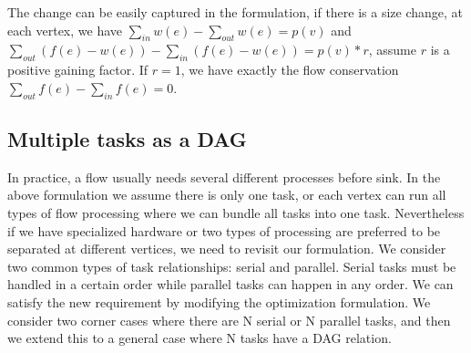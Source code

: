 The change can be easily captured in the formulation, if there is a size change, at each vertex, we have $\sum\limits_{in} w(e) - \sum\limits_{out}  w(e) = p(v)$ and $\sum\limits_{out} (f(e) - w(e))-\sum\limits_{in}  (f(e) - w(e))= p(v)*r$, assume $r$ is a positive gaining factor. If $r=1$, we have exactly the flow conservation $\sum\limits_{out} f(e) -\sum\limits_{in}  f(e)= 0$. 


\subsection{Multiple tasks as a DAG}
In practice, a flow usually needs several different processes before sink. In the above formulation we assume there is only one task, or each vertex can run all types of flow processing where we can bundle all tasks into one task. Nevertheless if we have specialized hardware or two types of processing are preferred to be separated at different vertices, we need to revisit our formulation. 
We consider two common types of task relationships: serial and parallel. Serial tasks must be handled in a certain order while parallel tasks can happen in any order. We can satisfy the new requirement by modifying the optimization formulation. We consider two corner cases where there are N serial or N parallel tasks, and then we extend this to a general case where N tasks have a DAG relation. 

